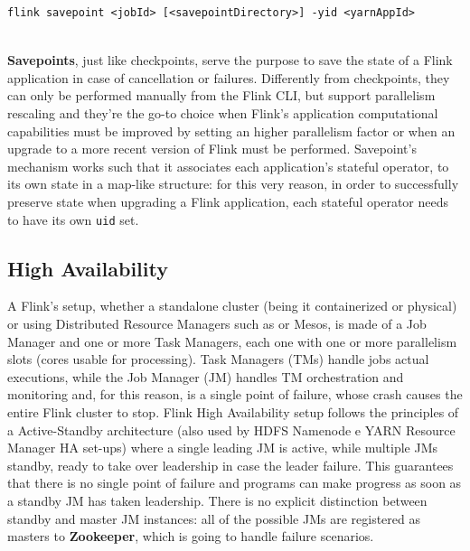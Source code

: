 \begin{code}
    \label{code:savepoint}
    \begin{verbatim}
flink savepoint <jobId> [<savepointDirectory>] -yid <yarnAppId> 
    \end{verbatim}
\end{code}~\\

\textbf{Savepoints}, just like checkpoints, serve the purpose to save the state of a Flink application in case of cancellation or failures. Differently from checkpoints, they can only be performed manually from the Flink CLI, but support parallelism rescaling and they're the go-to choice when Flink's application computational capabilities must be improved by setting an higher parallelism factor or when an upgrade to a more recent version of Flink must be performed. Savepoint's mechanism works such that it associates each application's stateful operator, to its own state in a map-like structure: for this very reason, in order to successfully preserve state when upgrading a Flink application, each stateful operator needs to have its own \texttt{uid} set.

\subsection{High Availability}

A Flink's setup, whether a standalone cluster (being it containerized or physical) or using Distributed Resource Managers such as  or Mesos, is made of a Job Manager and one or more Task Managers, each one with one or more parallelism slots (cores usable for processing). Task Managers (TMs) handle jobs actual executions, while the Job Manager (JM) handles TM orchestration and monitoring and, for this reason, is a single point of failure, whose crash causes the entire Flink cluster to stop.
Flink High Availability setup follows the principles of a Active-Standby architecture (also used by HDFS Namenode e YARN Resource Manager HA set-ups) where a single leading JM is active, while multiple JMs standby, ready to take over leadership in case the leader failure. This guarantees that there is no single point of failure and programs can make progress as soon as a standby JM has taken leadership. There is no explicit distinction between standby and master JM instances: all of the possible JMs are registered as masters to \textbf{Zookeeper}, which is going to handle failure scenarios.

